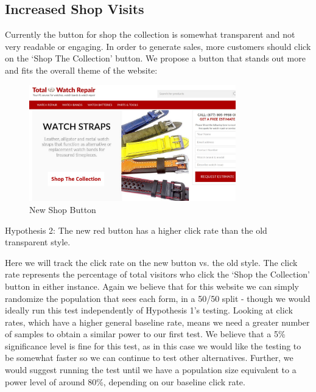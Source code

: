 \documentclass[12pt, authoryear]{elsarticle}
\begin{document}
\subsection{Increased Shop Visits}

Currently the button for shop the collection is somewhat transparent and not very readable or engaging. In order to generate sales, more customers should click on the ‘Shop The Collection’ button.  We propose a button that stands out more and fits the overall theme of the website:

\begin{figure}[H]
	\centering
	\includegraphics[clip, angle=0, width=0.8\textwidth]{New_Shop_Button.jpg}
	\caption{New Shop Button}\label{NewLandingPage}
\end{figure}

Hypothesis 2: The new red button has a higher click rate than the old transparent style.

Here we will track the click rate on the new button vs. the old style. The click rate represents the percentage of total visitors who click the ‘Shop the Collection’ button in either instance. Again we believe that for this website we can simply randomize the population that sees each form, in a 50/50 split - though we would ideally run this test independently of Hypothesis 1’s testing. Looking at click rates, which have a higher general baseline rate, means we need a greater number of samples to obtain a similar power to our first test.  We believe that a 5\% significance level is fine for this test, as in this case we would like the testing to be somewhat faster so we can continue to test other alternatives. Further, we would suggest running the test until we have a population size equivalent to a power level of around 80\%, depending on our baseline click rate.
\end{document}
